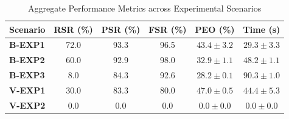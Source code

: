 \begin{table}[h!]
\centering
\caption{Aggregate Performance Metrics across Experimental Scenarios}
\label{tab:performance_metrics}
\begin{tabular}{l c c c c c}
\hline
\textbf{Scenario} & \textbf{RSR (\%)} & \textbf{PSR (\%)} & \textbf{FSR (\%)} & \textbf{PEO (\%)} & \textbf{Time (s)} \\
\hline
\textbf{B-EXP1} & 72.0 & 93.3 & 96.5 & $43.4 \pm 3.2$ & $29.3 \pm 3.3$ \\
\textbf{B-EXP2} & 60.0 & 92.9 & 98.0 & $32.9 \pm 1.1$ & $48.2 \pm 1.1$ \\
\textbf{B-EXP3} & 8.0 & 84.3 & 92.6 & $28.2 \pm 0.1$ & $90.3 \pm 1.0$ \\
\textbf{V-EXP1} & 30.0 & 83.3 & 80.0 & $47.0 \pm 0.5$ & $44.4 \pm 5.3$ \\
\textbf{V-EXP2} & 0.0 & 0.0 & 0.0 & $0.0 \pm 0.0$ & $0.0 \pm 0.0$ \\
\hline
\end{tabular}
\end{table}
